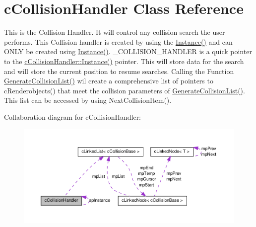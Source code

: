 \hypertarget{classc_collision_handler}{
\section{cCollisionHandler Class Reference}
\label{classc_collision_handler}
}


This is the Collision Handler. It will control any collision search the user performs. This Collision handler is created by using the \hyperlink{classc_collision_handler_a04d5c8d5b7ac854b4958dca195bf1c1b}{Instance()} and can ONLY be created using \hyperlink{classc_collision_handler_a04d5c8d5b7ac854b4958dca195bf1c1b}{Instance()}. \_\-COLLISION\_\-HANDLER is a quick pointer to the \hyperlink{classc_collision_handler_a04d5c8d5b7ac854b4958dca195bf1c1b}{cCollisionHandler::Instance()} pointer. This will store data for the search and will store the current position to resume searches. Calling the Function \hyperlink{classc_collision_handler_ae624b12e08bdae8b2dd252bcfa6f7d36}{GenerateCollisionList()} wil create a comprehensive list of pointers to cRenderobjects() that meet the collision parameters of \hyperlink{classc_collision_handler_ae624b12e08bdae8b2dd252bcfa6f7d36}{GenerateCollisionList()}. This list can be accessed by using NextCollisionItem().  




Collaboration diagram for cCollisionHandler:\nopagebreak
\begin{figure}[H]
\begin{center}
\leavevmode
\includegraphics[width=400pt]{classc_collision_handler__coll__graph}
\end{center}
\end{figure}
